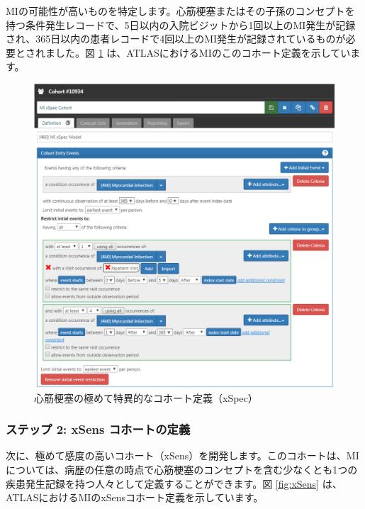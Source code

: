 \documentclass[
  11pt]{book}
\theoremstyle{definition}
\theoremstyle{definition}
\theoremstyle{definition}
\theoremstyle{definition}
\theoremstyle{remark}
\begin{document}
MIの可能性が高いものを特定します。心筋梗塞またはその子孫のコンセプトを持つ条件発生レコードで、5日以内の入院ビジットから1回以上のMI発生が記録され、365日以内の患者レコードで4回以上のMI発生が記録されているものが必要とされました。図 \ref{fig:xSpec} は、ATLASにおけるMIのこのコホート定義を示しています。

\begin{figure}

{\centering \includegraphics[width=1\linewidth]{images/ClinicalValidity/xSpec} 

}

\caption{心筋梗塞の極めて特異的なコホート定義（xSpec）}\label{fig:xSpec}
\end{figure}

\subsubsection*{ステップ 2: xSens コホートの定義}\label{ux30b9ux30c6ux30c3ux30d7-2-xsens-ux30b3ux30dbux30fcux30c8ux306eux5b9aux7fa9}

次に、極めて感度の高いコホート（xSens）を開発します。このコホートは、MIについては、病歴の任意の時点で心筋梗塞のコンセプトを含む少なくとも1つの疾患発生記録を持つ人々として定義することができます。図 \ref{fig:xSens} は、ATLASにおけるMIのxSensコホート定義を示しています。
\end{document}
